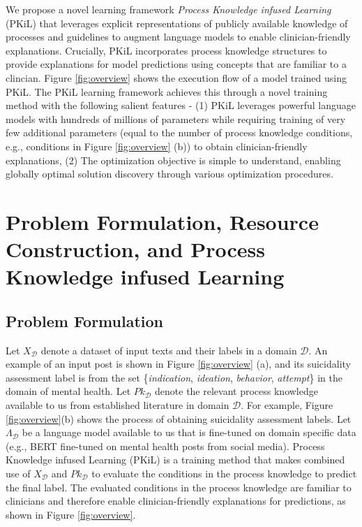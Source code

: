 \documentclass[letterpaper]{article} %
\begin{document}
We propose a novel learning framework \textit{Process Knowledge infused Learning} (PKiL) that leverages explicit representations of publicly available knowledge of processes and guidelines to augment language models to enable clinician-friendly explanations. Crucially, PKiL incorporates process knowledge structures to provide explanations for model predictions using concepts that are familiar to a clincian. Figure \ref{fig:overview} shows the execution flow of a model trained using PKiL. The PKiL learning framework achieves this through a novel training method with the following salient features - (1) PKiL leverages powerful language models with hundreds of millions of parameters while requiring training of very few additional parameters (equal to the number of process knowledge conditions, e.g., conditions in Figure \ref{fig:overview} (b)) to obtain clinician-friendly explanations, (2) The optimization objective is simple to understand, enabling globally optimal solution discovery through various optimization procedures.


\section{Problem Formulation, Resource Construction, and Process Knowledge infused Learning}
\subsection{Problem Formulation}
Let $X_{\mathcal{D}}$ denote a dataset of input texts and their labels in a domain $\mathcal{D}$. An example of an input post is shown in Figure \ref{fig:overview} (a), and its suicidality assessment label is from the set \{\textit{indication}, \textit{ideation}, \textit{behavior}, \textit{attempt}\} in the domain of mental health. Let $Pk_{\mathcal{D}}$ denote the relevant process knowledge available to us from established literature in domain $\mathcal{D}$. For example, Figure \ref{fig:overview}(b) shows the process of obtaining suicidality assessment labels. Let $\Lambda_{\mathcal{D}}$ be a language model available to us that is fine-tuned on domain specific data (e.g., BERT fine-tuned on mental health posts from social media).  Process Knowledge infused Learning (PKiL) is a training method that makes combined use of $X_{\mathcal{D}}$ and $Pk_{\mathcal{D}}$ to evaluate the conditions in the process knowledge to predict the final label. The evaluated conditions in the process knowledge are familiar to clinicians and therefore enable clinician-friendly explanations for predictions, as shown in Figure \ref{fig:overview}.  
\end{document}
